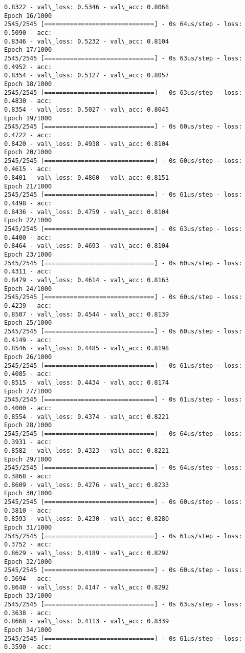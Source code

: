 \documentclass[11pt]{article}
\begin{document}
\begin{Verbatim}[commandchars=\\\{\}]
0.8322 - val\_loss: 0.5346 - val\_acc: 0.8068
Epoch 16/1000
2545/2545 [==============================] - 0s 64us/step - loss: 0.5090 - acc:
0.8346 - val\_loss: 0.5232 - val\_acc: 0.8104
Epoch 17/1000
2545/2545 [==============================] - 0s 63us/step - loss: 0.4952 - acc:
0.8354 - val\_loss: 0.5127 - val\_acc: 0.8057
Epoch 18/1000
2545/2545 [==============================] - 0s 63us/step - loss: 0.4830 - acc:
0.8354 - val\_loss: 0.5027 - val\_acc: 0.8045
Epoch 19/1000
2545/2545 [==============================] - 0s 60us/step - loss: 0.4722 - acc:
0.8420 - val\_loss: 0.4938 - val\_acc: 0.8104
Epoch 20/1000
2545/2545 [==============================] - 0s 60us/step - loss: 0.4615 - acc:
0.8401 - val\_loss: 0.4860 - val\_acc: 0.8151
Epoch 21/1000
2545/2545 [==============================] - 0s 61us/step - loss: 0.4498 - acc:
0.8436 - val\_loss: 0.4759 - val\_acc: 0.8104
Epoch 22/1000
2545/2545 [==============================] - 0s 63us/step - loss: 0.4400 - acc:
0.8464 - val\_loss: 0.4693 - val\_acc: 0.8104
Epoch 23/1000
2545/2545 [==============================] - 0s 60us/step - loss: 0.4311 - acc:
0.8479 - val\_loss: 0.4614 - val\_acc: 0.8163
Epoch 24/1000
2545/2545 [==============================] - 0s 60us/step - loss: 0.4239 - acc:
0.8507 - val\_loss: 0.4544 - val\_acc: 0.8139
Epoch 25/1000
2545/2545 [==============================] - 0s 60us/step - loss: 0.4149 - acc:
0.8546 - val\_loss: 0.4485 - val\_acc: 0.8198
Epoch 26/1000
2545/2545 [==============================] - 0s 61us/step - loss: 0.4085 - acc:
0.8515 - val\_loss: 0.4434 - val\_acc: 0.8174
Epoch 27/1000
2545/2545 [==============================] - 0s 61us/step - loss: 0.4000 - acc:
0.8554 - val\_loss: 0.4374 - val\_acc: 0.8221
Epoch 28/1000
2545/2545 [==============================] - 0s 64us/step - loss: 0.3931 - acc:
0.8582 - val\_loss: 0.4323 - val\_acc: 0.8221
Epoch 29/1000
2545/2545 [==============================] - 0s 64us/step - loss: 0.3868 - acc:
0.8609 - val\_loss: 0.4276 - val\_acc: 0.8233
Epoch 30/1000
2545/2545 [==============================] - 0s 60us/step - loss: 0.3810 - acc:
0.8593 - val\_loss: 0.4230 - val\_acc: 0.8280
Epoch 31/1000
2545/2545 [==============================] - 0s 61us/step - loss: 0.3752 - acc:
0.8629 - val\_loss: 0.4189 - val\_acc: 0.8292
Epoch 32/1000
2545/2545 [==============================] - 0s 60us/step - loss: 0.3694 - acc:
0.8640 - val\_loss: 0.4147 - val\_acc: 0.8292
Epoch 33/1000
2545/2545 [==============================] - 0s 63us/step - loss: 0.3638 - acc:
0.8668 - val\_loss: 0.4113 - val\_acc: 0.8339
Epoch 34/1000
2545/2545 [==============================] - 0s 61us/step - loss: 0.3590 - acc:

\end{Verbatim}
\end{document}
